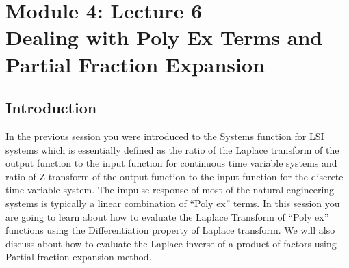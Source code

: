 \section{Module 4: Lecture 6\\Dealing with Poly Ex Terms and Partial Fraction Expansion}

\subsection{Introduction}
In the previous session you were introduced to the Systems function for LSI systems which is essentially defined as the ratio of the Laplace transform of the output function to the input function for continuous time variable systems and ratio of Z-transform of the output function to the input function for the discrete time variable system. The impulse response of most of the natural engineering systems is typically a linear combination of “Poly ex” terms. In this session you are going to learn about how to evaluate the Laplace Transform of “Poly ex” functions using the Differentiation property of Laplace transform. We will also discuss about how to evaluate the Laplace inverse of a product of factors using Partial fraction expansion method. 
